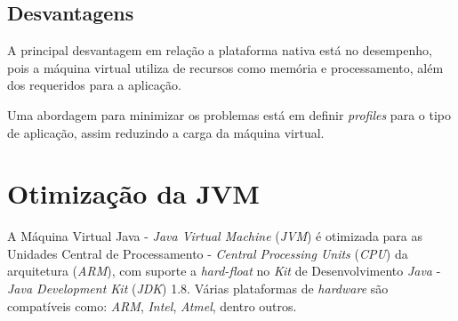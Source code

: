 \subsection{Desvantagens}

A principal desvantagem em relação a plataforma nativa está no desempenho, pois
a máquina virtual utiliza de recursos como memória e processamento, além dos
requeridos para a aplicação.

Uma abordagem para minimizar os problemas está em definir \textit{profiles}
para o tipo de aplicação, assim reduzindo a carga da máquina virtual.

\section{Otimização da JVM}

A Máquina Virtual Java - \textit{Java Virtual Machine} (\textit{JVM}) é
otimizada para as Unidades Central de Processamento - \textit{Central
  Processing Units} (\textit{CPU}) da arquitetura (\textit{ARM}), com suporte a
\textit{hard-float} no \textit{Kit} de Desenvolvimento \textit{Java} -
\textit{Java Development Kit} (\textit{JDK}) 1.8. Várias plataformas de
\textit{hardware} são compatíveis como: \textit{ARM}, \textit{Intel},
\textit{Atmel}, dentro outros.
